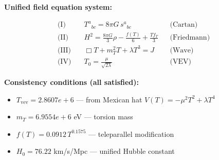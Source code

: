 
\textbf{Unified field equation system:}

\begin{align}
  \text{(I)} \quad & T^a{}_{bc} = 8\pi G \, s^a{}_{bc} && \text{(Cartan)} \\
  \text{(II)} \quad & H^2 = \frac{8\pi G}{3}\rho - \frac{f(T)}{6} + \frac{Tf_T}{3} && \text{(Friedmann)} \\
  \text{(III)} \quad & \Box T + m_T^2 T + \lambda T^3 = J && \text{(Wave)} \\
  \text{(IV)} \quad & T_0 = \frac{\mu}{\sqrt{2\lambda}} && \text{(VEV)}
\end{align}

\textbf{Consistency conditions (all satisfied):}
\begin{itemize}
  \item $T_{\text{vev}} = 2.8607e+6$ — from Mexican hat $V(T) = -\mu^2 T^2 + \lambda T^4$
  \item $m_T = 6.9554e+6$ eV — torsion mass
  \item $f(T) = 0.0912 \, T^{0.1575}$ — teleparallel modification
  \item $H_0 = 76.22$ km/s/Mpc — unified Hubble constant
\end{itemize}